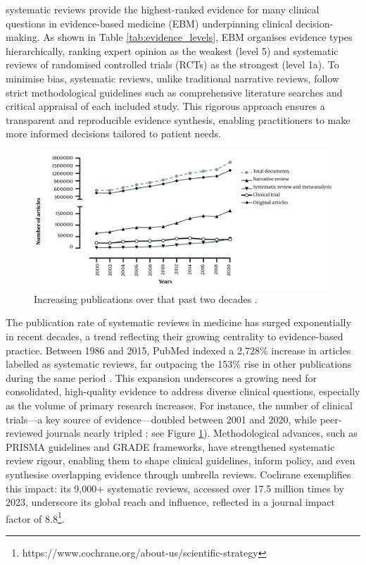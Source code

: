 \documentclass[10pt,oneside]{book}
\begin{document}
systematic reviews provide the highest-ranked evidence for many clinical questions in evidence-based medicine (EBM) underpinning clinical decision-making. As shown in Table \ref{tab:evidence_levels}, EBM organises evidence types hierarchically, ranking expert opinion as the weakest (level 5) and systematic reviews of randomised controlled trials (RCTs) as the strongest (level 1a). To minimise bias, systematic reviews, unlike traditional narrative reviews, follow strict methodological guidelines such as comprehensive literature searches and critical appraisal of each included study. This rigorous approach ensures a transparent and reproducible evidence synthesis, enabling practitioners to make more informed decisions tailored to patient needs.



\begin{figure}
    \centering
    \includegraphics[width=1\linewidth]{images/increase_in_publications.jpg}
    \caption{Increasing publications over that past two decades \cite{ghasemi_scientific_2022}.}
    \label{fig:increasing_publications_over_time}
\end{figure}

The publication rate of systematic reviews in medicine has surged exponentially in recent decades, a trend reflecting their growing centrality to evidence-based practice. Between 1986 and 2015, PubMed indexed a 2,728\% increase in articles labelled as systematic reviews, far outpacing the 153\% rise in other publications during the same period \cite{ioannidis_mass_2016}. This expansion underscores a growing need for consolidated, high-quality evidence to address diverse clinical questions, especially as the volume of primary research increases. For instance, the number of clinical trials—a key source of evidence—doubled between 2001 and 2020, while peer-reviewed journals nearly tripled \cite{ghasemi_scientific_2022}; see Figure \ref{fig:increasing_publications_over_time}). Methodological advances, such as PRISMA guidelines and GRADE frameworks, have strengthened systematic review rigour, enabling them to shape clinical guidelines, inform policy, and even synthesise overlapping evidence through umbrella reviews. Cochrane exemplifies this impact: its 9,000+ systematic reviews, accessed over 17.5 million times by 2023, underscore its global reach and influence, reflected in a journal impact factor of 8.8\footnote{https://www.cochrane.org/about-us/scientific-strategy}.
\end{document}
